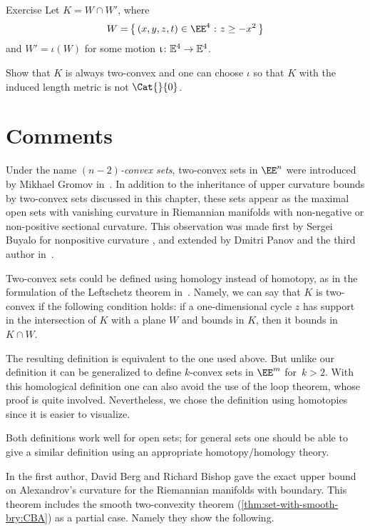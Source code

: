 \begin{thm}{Exercise}\label{ex:two-convex-not-a-CAT}
Let $K=W\cap W'$, where 
\[W=\set{(x,y,z,t)\in \EE^4}{z\ge -x^2}\]
and $W'=\iota(W)$ for some motion $\iota\:\EE^4\to\EE^4$.

Show that $K$ is always two-convex and one can choose $\iota$ so that $K$  with the induced length metric is not $\Cat{}{0}$.
\end{thm}









\section{Comments}

Under the name \emph{$(n-2)$-convex sets}, 
two-convex sets in $\EE^n$ were introduced by Mikhael Gromov in~\cite{gromov:SaGMC}.
In addition to the inheritance of upper curvature bounds by two-convex sets discussed in this chapter, 
these sets appear as the maximal open sets with vanishing curvature in  Riemannian manifolds with non-negative or non-positive sectional curvature.
This observation was made first by Sergei Buyalo for nonpositive curvature \cite[Lemma 5.8]{buyalo}, 
and extended by Dmitri Panov and the third author in~\cite{panov-petrunin:sweeping}.

Two-convex sets could be defined using homology instead of homotopy, as in the formulation of the Leftschetz theorem in~\cite[\S\textonehalf]{gromov:SaGMC}.
Namely, we can say that $K$ is two-convex if the following condition holds: if a one-dimensional cycle $z$ has support in the intersection of $K$ with a plane $W$ and bounds in $K$, then it bounds in $K\cap W$.


The resulting definition is equivalent to the one used above.
But unlike our definition it can be generalized to define $k$-convex sets in $\EE^m$ for~$k>2$.
With this homological definition one can also avoid the use of the loop theorem, whose proof is quite involved.
Nevertheless, we chose the definition using homotopies  since it is easier to visualize.


Both definitions work well for open sets; for general sets one should be able to give a similar definition using  an appropriate homotopy/ho\-mo\-logy theory.

In \cite{a-b-b:CBA-m-w-b} the first author, David Berg and Richard Bishop gave the exact upper bound on Alexandrov's curvature for the Riemannian manifolds with boundary.
This theorem includes the smooth two-convexity theorem (\ref{thm:set-with-smooth-bry:CBA}) as a partial case.
Namely they show the following.

